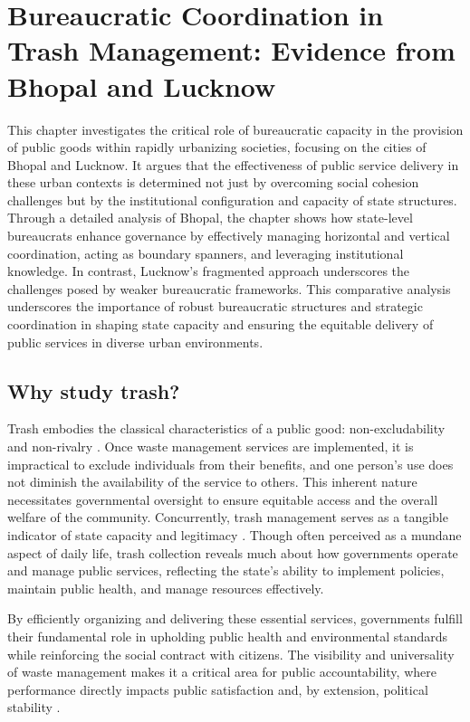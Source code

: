 
\chapter{Bureaucratic Coordination in Trash Management: Evidence from Bhopal and Lucknow}

This chapter investigates the critical role of bureaucratic capacity in the provision of public goods within rapidly urbanizing societies, focusing on the cities of Bhopal and Lucknow. It argues that the effectiveness of public service delivery in these urban contexts is determined not just by overcoming social cohesion challenges but by the institutional configuration and capacity of state structures. Through a detailed analysis of Bhopal, the chapter shows how state-level bureaucrats enhance governance by effectively managing horizontal and vertical coordination, acting as boundary spanners, and leveraging institutional knowledge. In contrast, Lucknow's fragmented approach underscores the challenges posed by weaker bureaucratic frameworks. This comparative analysis underscores the importance of robust bureaucratic structures and strategic coordination in shaping state capacity and ensuring the equitable delivery of public services in diverse urban environments.

\section{Why study trash?}

Trash embodies the classical characteristics of a public good: non-excludability and non-rivalry \citep{Samuelson1954, Bennett1979}. Once waste management services are implemented, it is impractical to exclude individuals from their benefits, and one person's use does not diminish the availability of the service to others. This inherent nature necessitates governmental oversight to ensure equitable access and the overall welfare of the community. Concurrently, trash management serves as a tangible indicator of state capacity and legitimacy \citep{Fukuyama2013}. Though often perceived as a mundane aspect of daily life, trash collection reveals much about how governments operate and manage public services, reflecting the state's ability to implement policies, maintain public health, and manage resources effectively.

By efficiently organizing and delivering these essential services, governments fulfill their fundamental role in upholding public health and environmental standards while reinforcing the social contract with citizens. The visibility and universality of waste management makes it a critical area for public accountability, where performance directly impacts public satisfaction and, by extension, political stability \citep{Peters2016}.

